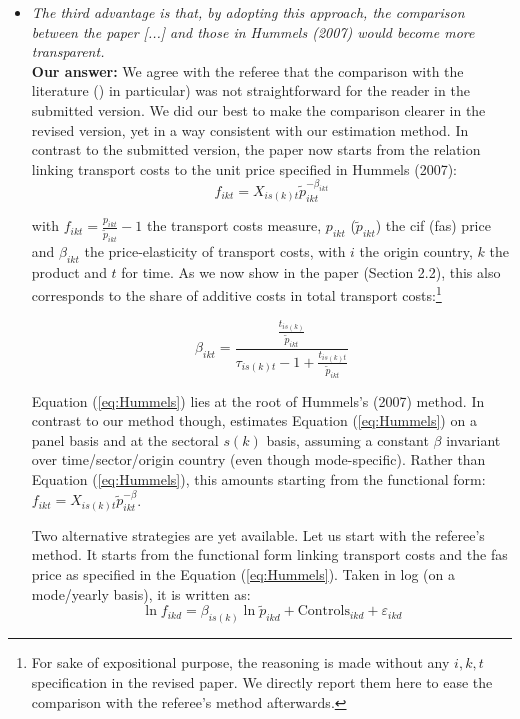 \documentclass[a4paper,11pt]{article}
\begin{document}
\begin{itemize}
\item  \textit{The third advantage is that, by adopting this approach, the comparison between the paper [...] and those in Hummels (2007) would become more transparent.}\\
     \textbf{Our answer:}
     We agree with the referee that the comparison with the literature (\citealp{hummels2007}) in particular) was not straightforward for the reader in the submitted version. We did our best to make the comparison clearer in the revised version, yet in a way consistent with our estimation method. In contrast to the submitted version, the paper now starts from the relation linking transport costs to the unit price specified in Hummels (2007):
    \begin{equation}
    f_{ikt} = X_{is(k)t}\widetilde{p}_{ikt}^{-\beta_{ikt}} \label{eq:Hummels}
    \end{equation}

     with $f_{ikt} = \frac{p_{ikt}}{\widetilde{p}_{ikt}} -1 $ the transport costs measure, $p_{ikt}$ ($\widetilde{p}_{ikt}$) the cif (fas) price and $\beta_{ikt}$ the price-elasticity of transport costs, with $i$ the origin country, $k$ the product and $t$ for time. As we now show in the paper (Section 2.2), this also corresponds to the share of additive costs in total transport costs:\footnote{For sake of expositional purpose, the reasoning is made without any $i,k,t$ specification in the revised paper. We directly report them here to ease the comparison with the referee's method afterwards.}

     \begin{equation}
     \beta_{ikt} = \frac{\frac{t_{is(k)}}{\widetilde{p}_{ikt}}}{\tau_{is(k)t}-1+\frac{t_{is(k)t}}{\widetilde{p}_{ikt}} } \label{eq:beta_TC}
     \end{equation}

     Equation (\ref{eq:Hummels}) lies at the root of Hummels's (2007) method. In contrast to our method though, \cite{hummels2007} estimates Equation (\ref{eq:Hummels}) on a panel basis and at the sectoral $s(k)$ basis, assuming a constant $\beta$ invariant over time/sector/origin country (even though mode-specific). Rather than Equation (\ref{eq:Hummels}), this amounts starting from the functional form: $f_{ikt} = X_{is(k)t}\widetilde{p}_{ikt}^{-\beta}$.

     Two alternative strategies are yet available. Let us start with the referee's method. It starts from the functional form linking transport costs and the fas price as specified in the Equation (\ref{eq:Hummels}). Taken in log (on a mode/yearly basis), it is written as:
     $$\ln f_{ikd} = \beta_{is(k)}\ln \widetilde{p}_{ikd} +\text{Controls}_{ikd}+ \varepsilon_{ikd}$$


\end{itemize}
\end{document}
